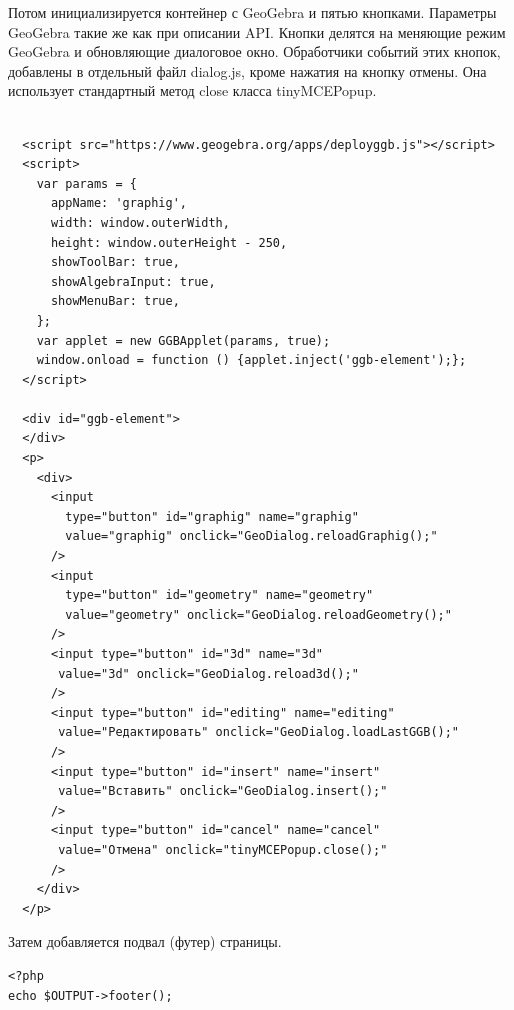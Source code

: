 \documentclass[14pt,Diplom]{diplomwork}
\begin{document}
Потом инициализируется контейнер с GeoGebra и пятью кнопками. Параметры GeoGebra такие же как при описании API. Кнопки делятся на меняющие режим GeoGebra и обновляющие диалоговое окно. Обработчики событий этих кнопок, добавлены в отдельный файл dialog.js, кроме нажатия на кнопку отмены. Она использует стандартный метод close класса tinyMCEPopup.

\begin{verbatim}
  
  <script src="https://www.geogebra.org/apps/deployggb.js"></script>
  <script>
    var params = {
      appName: 'graphig', 
      width: window.outerWidth,
      height: window.outerHeight - 250, 
      showToolBar: true, 
      showAlgebraInput: true, 
      showMenuBar: true,
    };
    var applet = new GGBApplet(params, true);
    window.onload = function () {applet.inject('ggb-element');};
  </script>
  
  <div id="ggb-element">
  </div>
  <p>
    <div>
      <input 
        type="button" id="graphig" name="graphig" 
        value="graphig" onclick="GeoDialog.reloadGraphig();"
      />
      <input
        type="button" id="geometry" name="geometry" 
        value="geometry" onclick="GeoDialog.reloadGeometry();"
      />
      <input type="button" id="3d" name="3d"
       value="3d" onclick="GeoDialog.reload3d();"
      />
      <input type="button" id="editing" name="editing"
       value="Редактировать" onclick="GeoDialog.loadLastGGB();"
      />
      <input type="button" id="insert" name="insert"
       value="Вставить" onclick="GeoDialog.insert();"
      />
      <input type="button" id="cancel" name="cancel"
       value="Отмена" onclick="tinyMCEPopup.close();"
      />
    </div>
  </p>  
\end{verbatim}

Затем добавляется подвал (футер) страницы.
\begin{verbatim}
<?php
echo $OUTPUT->footer();
\end{verbatim}
\end{document}
